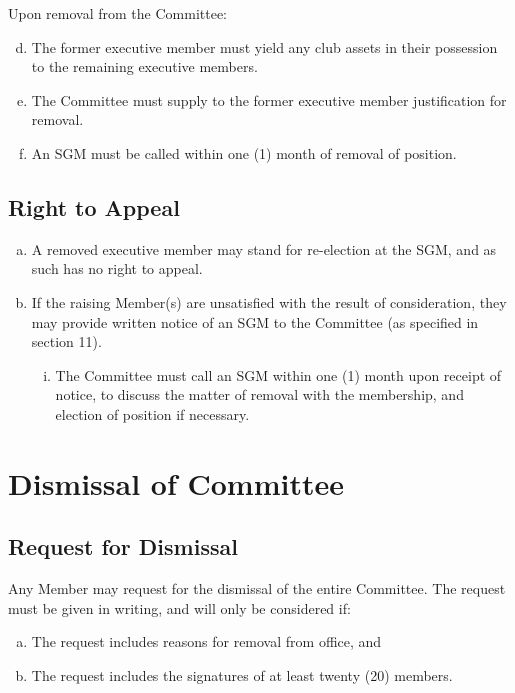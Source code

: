 \documentclass[a4paper,12pt]{article}
\begin{document}
Upon removal from the Committee:

\begin{enumerate}[a)]
	\setcounter{enumi}{3}
	\item The former executive member must yield any club assets in their possession to the remaining executive members.
	\item The Committee must supply to the former executive member justification for removal.
	\item An SGM must be called within one (1) month of removal of position.
\end{enumerate}

\subsection{Right to Appeal}

\begin{enumerate}[a)]
	\item A removed executive member may stand for re-election at the SGM, and as such has no right to appeal.
	\item If the raising Member(s) are unsatisfied with the result of consideration, they may provide written notice of an SGM to the Committee (as specified in section 11).
	\begin{enumerate}[i)]
		\item The Committee must call an SGM within one (1) month upon receipt of notice, to discuss the matter of removal with the membership, and election of position if necessary.
	\end{enumerate}
\end{enumerate}

\section{Dismissal of Committee}

\subsection{Request for Dismissal}

Any Member may request for the dismissal of the entire Committee. The request must be given in writing, and will only be considered if:

\begin{enumerate}[a)]
	\item The request includes reasons for removal from office, and
	\item The request includes the signatures of at least twenty (20) members.
\end{enumerate}
\end{document}
